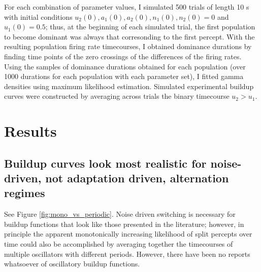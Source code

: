 \documentclass[10pt]{article}
\begin{document}
For each combination of parameter values, I simulated 500 trials of length 10 s with initial conditions $u_2(0), a_1(0), a_2(0), n_1(0), n_2(0) = 0$ and $u_1(0) = 0.5$; thus, at the beginning of each simulated trial, the first population to become dominant was always that corresonding to the first percept. With the resulting population firing rate timecourses, I obtained dominance durations by finding time points of the zero crossings of the differences of the firing rates. Using the samples of dominance durations obtained for each population (over 1000 durations for each population with each parameter set), I fitted gamma densities using maximum likelihood estimation. Simulated experimental buildup curves were constructed by averaging across trials the binary timecourse $u_2 > u_1$. 


\section*{Results}
\subsection*{Buildup curves look most realistic for noise-driven, not adaptation driven, alternation regimes}
See Figure \ref{fig:mono_vs_periodic}. Noise driven switching is necessary for buildup functions that look like those presented in the literature; however, in principle the apparent monotonically increasing likelihood of split percepts over time could also be accomplished by averaging together the timecourses of multiple oscillators with different periods. However, there have been no reports whatsoever of oscillatory buildup functions.
\end{document}
